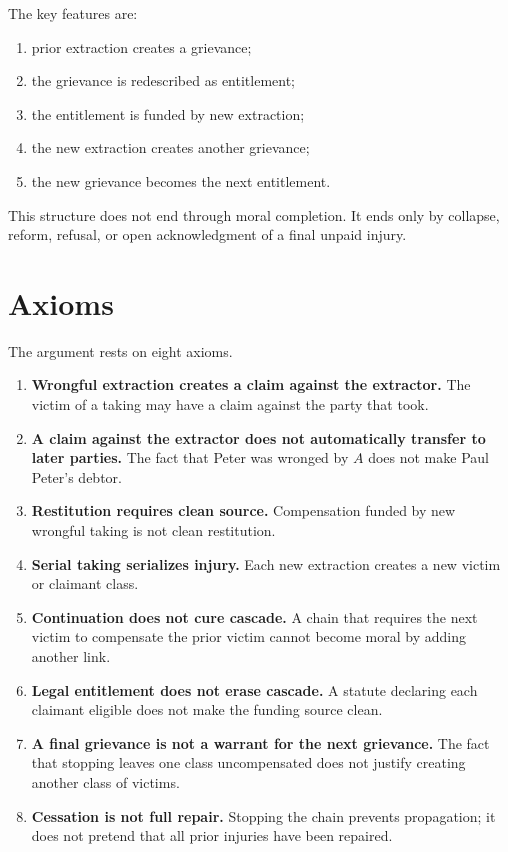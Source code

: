 \documentclass[12pt]{article}
\begin{document}
The key features are:

\begin{enumerate}
  \item prior extraction creates a grievance;
  \item the grievance is redescribed as entitlement;
  \item the entitlement is funded by new extraction;
  \item the new extraction creates another grievance;
  \item the new grievance becomes the next entitlement.
\end{enumerate}

This structure does not end through moral completion. It ends only by collapse, reform, refusal, or open acknowledgment of a final unpaid injury.

\section{Axioms}

The argument rests on eight axioms.

\begin{enumerate}
  \item \textbf{Wrongful extraction creates a claim against the extractor.} The victim of a taking may have a claim against the party that took.

  \item \textbf{A claim against the extractor does not automatically transfer to later parties.} The fact that Peter was wronged by \(A\) does not make Paul Peter's debtor.

  \item \textbf{Restitution requires clean source.} Compensation funded by new wrongful taking is not clean restitution.

  \item \textbf{Serial taking serializes injury.} Each new extraction creates a new victim or claimant class.

  \item \textbf{Continuation does not cure cascade.} A chain that requires the next victim to compensate the prior victim cannot become moral by adding another link.

  \item \textbf{Legal entitlement does not erase cascade.} A statute declaring each claimant eligible does not make the funding source clean.

  \item \textbf{A final grievance is not a warrant for the next grievance.} The fact that stopping leaves one class uncompensated does not justify creating another class of victims.

  \item \textbf{Cessation is not full repair.} Stopping the chain prevents propagation; it does not pretend that all prior injuries have been repaired.
\end{enumerate}
\end{document}
